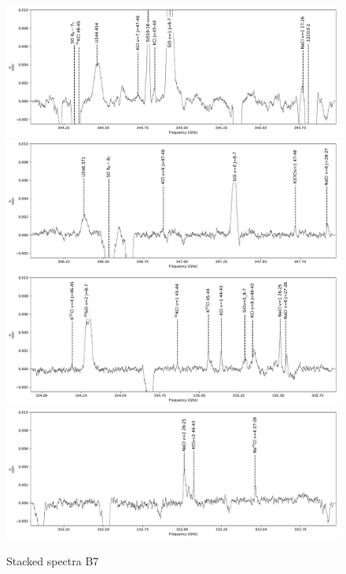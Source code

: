 \documentclass[12pt]{article}
\begin{document}
\begin{figure}[!htp]
\includegraphics[scale=1,width=5.5in]{figures/lines_labeled_OrionSourceI_B7.lb_spw0_robust0.5.pdf}
\includegraphics[scale=1,width=5.5in]{figures/lines_labeled_OrionSourceI_B7.lb_spw1_robust0.5.pdf}
\includegraphics[scale=1,width=5.5in]{figures/lines_labeled_OrionSourceI_B7.lb_spw2_robust0.5.pdf}
\includegraphics[scale=1,width=5.5in]{figures/lines_labeled_OrionSourceI_B7.lb_spw3_robust0.5.pdf}
\caption{Stacked spectra B7}
\label{fig:spectrab7}
\end{figure}
\end{document}
